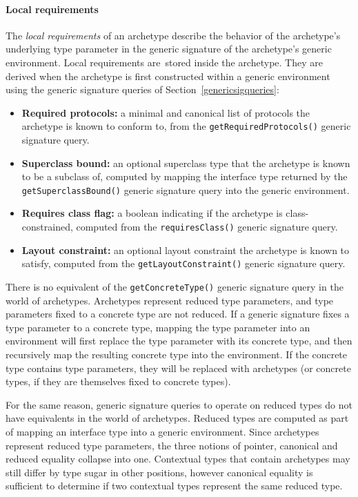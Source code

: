 \documentclass[a4paper,headsepline,bibliography=totoc,toc=flat,fleqn,twoside=semi]{scrbook}
\theoremstyle{definition}
\theoremstyle{definition}
\theoremstyle{definition}
\begin{document}
\paragraph{Local requirements}
The \emph{local requirements} of an archetype describe the behavior of the archetype's underlying type parameter in the generic signature of the archetype's generic environment. Local requirements are stored inside the archetype. They are derived when the archetype is first constructed within a generic environment using the generic signature queries of Section~\ref{genericsigqueries}:
\begin{itemize}
\item \textbf{Required protocols:} a minimal and canonical list of protocols the archetype is known to conform to, from the \texttt{getRequiredProtocols()} generic signature query.
\item \textbf{Superclass bound:} an optional superclass type that the archetype is known to be a subclass of, computed by mapping the interface type returned by the \texttt{getSuperclassBound()} generic signature query into the generic environment.
\item \textbf{Requires class flag:} a boolean indicating if the archetype is class-constrained, computed from the \texttt{requiresClass()} generic signature query.
\item \textbf{Layout constraint:} an optional layout constraint the archetype is known to satisfy, computed from the \texttt{getLayoutConstraint()} generic signature query.
\end{itemize}
There is no equivalent of the \texttt{getConcreteType()} generic signature query in the world of archetypes. Archetypes represent reduced type parameters, and type parameters fixed to a concrete type are not reduced. If a generic signature fixes a type parameter to a concrete type, mapping the type parameter into an environment will first replace the type parameter with its concrete type, and then recursively map the resulting concrete type into the environment. If the concrete type contains type parameters, they will be replaced with archetypes (or concrete types, if they are themselves fixed to concrete types).

For the same reason, generic signature queries to operate on reduced types do not have equivalents in the world of archetypes. Reduced types are computed as part of mapping an interface type into a generic environment. Since archetypes represent reduced type parameters, the three notions of pointer, canonical and reduced equality collapse into one. Contextual types that contain archetypes may still differ by type sugar in other positions, however canonical equality is sufficient to determine if two contextual types represent the same reduced type.
\end{document}
